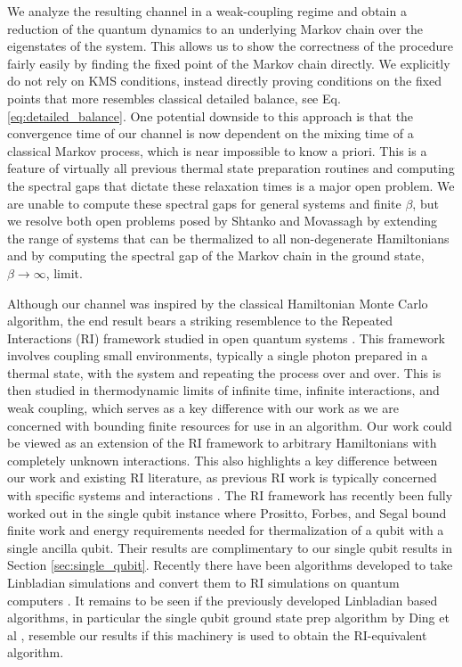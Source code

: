 \documentclass[
 amsmath,amssymb,
 aps,
onecolumn, 
nofootinbib]{revtex4-2}
\begin{document}
We analyze the resulting channel in a weak-coupling regime and obtain a reduction of the quantum dynamics to an underlying Markov chain over the eigenstates of the system. This allows us to show the correctness of the procedure fairly easily by finding the fixed point of the Markov chain directly. We explicitly do not rely on KMS conditions, instead directly proving conditions on the fixed points that more resembles classical detailed balance, see Eq. \eqref{eq:detailed_balance}. One potential downside to this approach is that the convergence time of our channel is now dependent on the mixing time of a classical Markov process, which is near impossible to know a priori. This is a feature of virtually all previous thermal state preparation routines and computing the spectral gaps that dictate these relaxation times is a major open problem. We are unable to compute these spectral gaps for general systems and finite $\beta$, but we resolve both open problems posed by Shtanko and Movassagh \cite{shtanko2023preparingthermalstatesnoiseless} by extending the range of systems that can be thermalized to all non-degenerate Hamiltonians and by computing the spectral gap of the Markov chain in the ground state, $\beta \to \infty$, limit.


Although our channel was inspired by the classical Hamiltonian Monte Carlo algorithm, the end result bears a striking resemblence to the Repeated Interactions (RI) framework studied in open quantum systems \cite{ciccarello2022repeated}. This framework involves coupling small environments, typically a single photon prepared in a thermal state, with the system and repeating the process over and over. This is then studied in thermodynamic limits of infinite time, infinite interactions, and weak coupling, which serves as a key difference with our work as we are concerned with bounding finite resources for use in an algorithm. Our work could be viewed as an extension of the RI framework to arbitrary Hamiltonians with completely unknown interactions. This also highlights a key difference between our work and existing RI literature, as previous RI work is typically concerned with specific systems and interactions \cite{polla2021quantum}. The RI framework has recently been fully worked out in the single qubit instance \cite{prositto2025equilibrium} where Prositto, Forbes, and Segal bound finite work and energy requirements needed for thermalization of a qubit with a single ancilla qubit. Their results are complimentary to our single qubit results in Section \ref{sec:single_qubit}. Recently there have been algorithms developed to take Linbladian simulations and convert them to RI simulations on quantum computers \cite{pocrnic2024quantumsimulationlindbladiandynamics}. It remains to be seen if the previously developed Linbladian based algorithms, in particular the single qubit ground state prep algorithm by Ding et al \cite{ding2024single}, resemble our results if this machinery is used to obtain the RI-equivalent algorithm.
\end{document}
